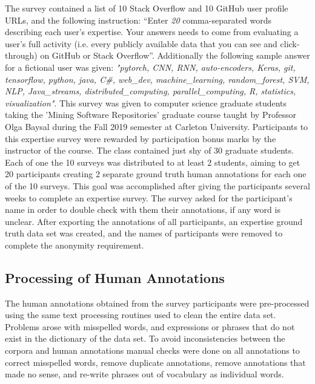             The survey contained a list of 10 Stack Overflow and 10 GitHub user profile URLs, and the following instruction: ``Enter \emph{20} comma-separated words describing each user's expertise. Your answers needs to come from evaluating a user's full activity (i.e. every publicly available data that you can see and click-through) on GitHub or Stack Overflow''. Additionally the following sample answer for a fictional user was given: \emph{"pytorch, CNN, RNN, auto-encoders, Keras, git, tensorflow, python, java, C\#, web\_dev, machine\_learning, random\_forest, SVM, NLP, Java\_streams, distributed\_computing, parallel\_computing, R, statistics, visualization"}. This survey was given to computer science graduate students taking the 'Mining Software Repositories' graduate course taught by Professor Olga Baysal during the Fall 2019 semester at Carleton University. Participants to this expertise survey were rewarded by participation bonus marks by the instructor of the course. The class contained just shy of 30 graduate students. Each of one the 10 surveys was distributed to at least 2 students, aiming to get 20 participants creating 2 separate ground truth human annotations for each one of the 10 surveys. This goal was accomplished after giving the participants several weeks to complete an expertise survey. The survey asked for the participant's name in order to double check with them their annotations, if any word is unclear. After exporting the annotations of all participants, an expertise ground truth data set was created, and the names of participants were removed to complete the anonymity requirement. 
        
        \subsection{Processing of Human Annotations}
        
            The human annotations obtained from the survey participants were pre-processed using the same text processing routines used to clean the entire data set. Problems arose with misspelled words, and expressions or phrases that do not exist in the dictionary of the data set. To avoid inconsistencies between the corpora and human annotations manual checks were done on all annotations to correct misspelled words, remove duplicate annotations, remove annotations that made no sense, and re-write phrases out of vocabulary as individual words. 
            

